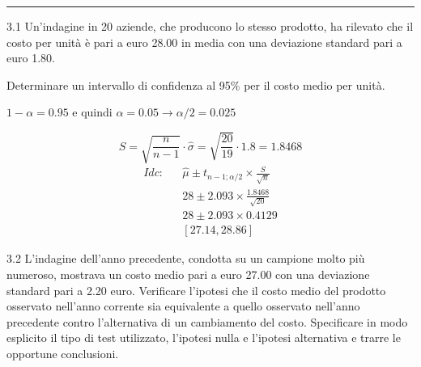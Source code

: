\documentclass[
  11pt,
]{book}
\theoremstyle{mytheoremstyle}
\theoremstyle{mydefstyle}
\newenvironment{sol}
  {
  \begin{tcolorbox}[enhanced,breakable,arc=0.1mm,boxrule=1pt,colback=white,colframe=iblue,
  title=\bf \fontfamily{lmss}\selectfont \hspace{.5 cm} Soluzione,drop fuzzy shadow]

}{
\end{tcolorbox}
  }
\begin{document}
\begin{center}\rule{0.5\linewidth}{0.5pt}\end{center}

3.1 Un'indagine in 20 aziende, che producono lo stesso prodotto,
ha rilevato che il costo per unità è pari a euro 28.00
in media con una deviazione standard pari a euro 1.80.

Determinare un intervallo di confidenza al 95\%
per il costo medio per unità.

\begin{sol}
\(1-\alpha =0.95\) e quindi \(\alpha=0.05\rightarrow \alpha/2=0.025\)

\[
      S  =\sqrt{\frac {n}{n-1}}\cdot\hat\sigma =
     \sqrt{\frac { 20 }{ 19 }}\cdot 1.8 = 1.8468 
\]
\begin{eqnarray*}
  Idc: & &  \hat\mu \pm  t_{n-1;\alpha/2} \times \frac{S}{\sqrt{n}} \\
     & &  28 \pm  2.093 \times \frac{ 1.8468 }{\sqrt{ 20 }} \\
     & &  28 \pm  2.093 \times  0.4129 \\
     & & [ 27.14 ,  28.86 ]
\end{eqnarray*}

\end{sol}

3.2 L'indagine dell'anno precedente, condotta
su un campione molto più numeroso, mostrava un costo medio
pari a euro 27.00 con una deviazione standard pari a 2.20 euro.
Verificare l'ipotesi che il costo medio del prodotto osservato
nell'anno corrente sia equivalente a quello osservato nell'anno
precedente contro l'alternativa di un cambiamento del costo.
Specificare in modo esplicito il tipo di test utilizzato,
l'ipotesi nulla e l'ipotesi alternativa e trarre le opportune
conclusioni.
\end{document}
